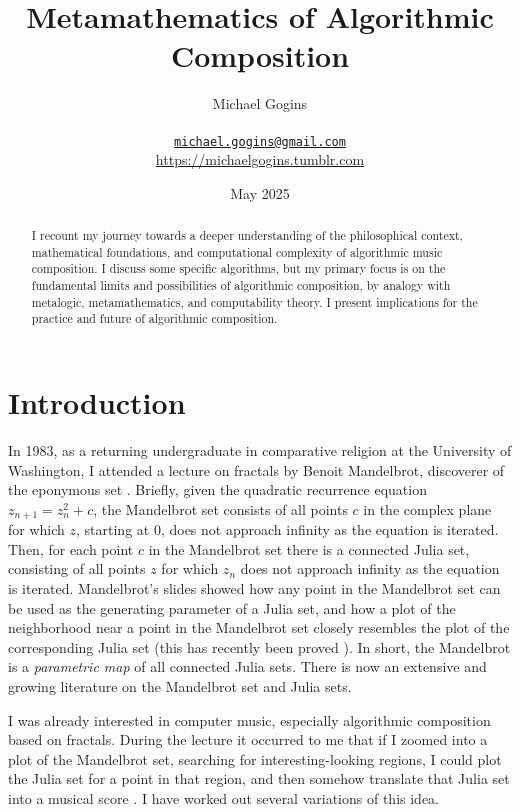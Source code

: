 \documentclass[11pt,papersize=a4]{scrartcl}
\begin{document}
\title{Metamathematics of Algorithmic Composition}
\author{Michael Gogins \\ \\ \texttt{\href{mailto:michael.gogins@gmail.com}{michael.gogins@gmail.com}}  \\ \url{https://michaelgogins.tumblr.com}}
\date{May 2025}
\maketitle
\begin{abstract}
I recount my journey towards a deeper understanding of the philosophical context, mathematical foundations, and computational complexity of algorithmic music composition. I discuss some specific algorithms, but my primary focus is on the fundamental limits and possibilities of algorithmic composition, by analogy with metalogic, metamathematics, and computability theory. I present implications for the practice and future of algorithmic composition. 
\end{abstract}

\section*{Introduction}

In 1983, as a returning undergraduate in comparative religion at the University of Washington, I attended a lecture on fractals by Benoit Mandelbrot, discoverer of the eponymous set \parencite{citeulike:580392, peitgen2004mandelbrot}. Briefly, given the quadratic recurrence equation $z_{n+1} = z_n^2 + c$, the Mandelbrot set consists of all points $c$ in the complex plane for which $z$, starting at 0, does not approach infinity as the equation is iterated. Then, for each point $c$ in the Mandelbrot set there is a connected Julia set, consisting of all points $z$ for which $z_n$ does not approach infinity as the equation is iterated. Mandelbrot's slides showed how any point in the Mandelbrot set can be used as the generating parameter of a Julia set, and how a plot of the neighborhood near a point in the Mandelbrot set closely resembles the plot of the corresponding Julia set \parencite{lei1990similarity} (this has recently been proved \parencite{kawahira2018julia}). In short, the Mandelbrot is a \emph{parametric map} of all connected Julia sets. There is now an extensive and growing literature on the Mandelbrot set and Julia sets. 

I was already interested in computer music, especially algorithmic composition based on fractals. During the lecture it occurred to me that if I zoomed into a plot of the Mandelbrot set, searching for interesting-looking regions, I could plot the Julia set for a point in that region, and then somehow translate that Julia set into a musical score \parencite{obsessed}. I have worked out several variations of this idea.
\end{document}
